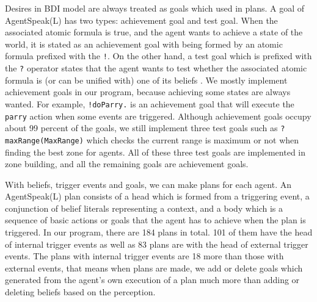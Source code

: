 Desires in BDI model are always treated as goals which used in plans. A goal of AgentSpeak(L) has two types: achievement goal and test goal. When the associated atomic formula is true, and the agent wants to achieve a state of the world, it is stated as an achievement goal with being formed by an atomic formula prefixed with the \texttt{!}. On the other hand, a test goal which is prefixed with the \texttt{?} operator states that the agent wants to test whether the associated atomic formula is (or can be unified with) one of its beliefs \cite{rafael_BDIAgent_2005}. We mostly implement achievement goals in our program, because achieving some states are always wanted. For example, \texttt{!doParry.} is an achievement goal that will execute the \texttt{parry} action when some events are triggered. Although achievement goals occupy about 99 percent of the goals, we still implement three test goals such as \texttt{?maxRange(MaxRange)} which checks the current range is maximum or not when finding the best zone for agents. All of these three test goals are implemented in zone building, and all the remaining goals are achievement goals.

With beliefs, trigger events and goals, we can make plans for each agent. An AgentSpeak(L) plan consists of a head which is formed from a triggering event, a conjunction of belief literals representing a context, and a body which is a sequence of basic actions or goals that the agent has to achieve when the plan is triggered\cite{rafael_BDIAgent_2005}. In our program, there are 184 plans in total. 101 of them have the head of internal trigger events as well as 83 plans are with the head of external trigger events. The plans with internal trigger events are 18 more than those with external events, that means when plans are made, we add or delete goals which generated from the agent's own execution of a plan much more than adding or deleting beliefs based on the perception.

